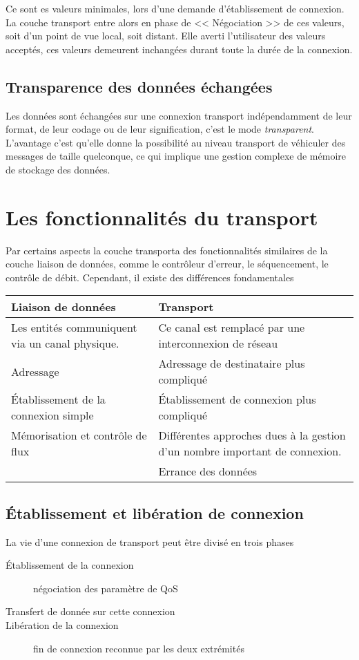 \documentclass[12pt,a4paper,openany]{book}
\begin{document}
	Ce sont es valeurs minimales, lors d'une demande d'établissement de connexion. La couche transport entre alors en phase de << Négociation >> de ces
	valeurs, soit d'un point de vue local, soit distant. Elle averti l'utilisateur des valeurs acceptés, ces valeurs demeurent inchangées durant toute
	la durée de la connexion.

	\subsection{Transparence des données échangées}
	Les données sont échangées sur une connexion transport indépendamment de leur format, de leur codage ou de leur signification, c'est le mode
	\textit{transparent}. L'avantage c'est qu'elle donne la possibilité au niveau transport de véhiculer des messages de taille quelconque, ce qui
	implique une gestion complexe de mémoire de stockage des données.

	\section{Les fonctionnalités du transport}
	Par certains aspects la couche transporta des fonctionnalités similaires de la couche liaison de données, comme le contrôleur d'erreur, le
	séquencement, le contrôle de débit. Cependant, il existe des différences fondamentales

	\begin{table}[H]
		\begin{tabular}{p{8cm}|p{8cm}}
			\textbf{Liaison de données} & \textbf{Transport}\\
			\hline
			Les entités communiquent via un canal physique.& Ce canal est remplacé par une interconnexion de réseau\\
			\hline
			Adressage & Adressage de destinataire plus compliqué\\
			\hline
			Établissement de la connexion simple &  Établissement de connexion plus compliqué\\
			\hline
			Mémorisation et contrôle de flux & Différentes approches dues à la gestion d'un nombre important de connexion. \\
			\hline
			& Errance des données
		\end{tabular}
		\end{table}

		\subsection{Établissement et libération de connexion}
	La vie d'une connexion de transport peut être divisé en trois phases
	\begin{description}
		\item[Établissement de la connexion] négociation des paramètre de QoS
		\item[Transfert de donnée sur cette connexion] 
		\item[Libération de la connexion]  fin de connexion reconnue par les deux extrémités
	\end{description}
\end{document}
